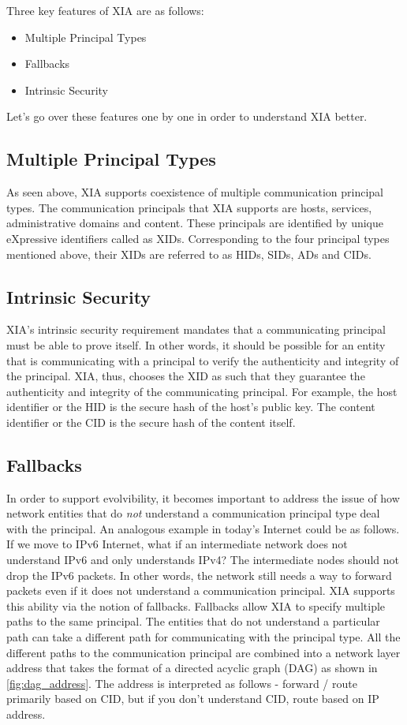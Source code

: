 Three key features of XIA are as follows:
\begin{itemize}
\item{Multiple Principal Types}
\item{Fallbacks}
\item{Intrinsic Security}
\end{itemize}
Let's go over these features one by one in order to understand XIA
better.
\subsection{Multiple Principal Types}
As seen above, XIA supports coexistence of multiple communication
principal types. The communication principals that XIA supports are
hosts, services, administrative domains and content. These principals
are identified by unique eXpressive identifiers called as
XIDs. Corresponding to the four principal types mentioned above, their
XIDs are referred to as HIDs, SIDs, ADs and CIDs.

\subsection{Intrinsic Security}
XIA's intrinsic security requirement mandates that a communicating
principal must be able to prove itself. In other words, it should be
possible for an entity that is communicating with a principal to
verify the authenticity and integrity of the principal. XIA, thus,
chooses the XID as such that they guarantee the authenticity and
integrity of the communicating principal. For example, the host
identifier or the HID is the secure hash of the host's public key. The
content identifier or the CID is the secure hash of the content
itself.

\subsection{Fallbacks}
In order to support evolvibility, it becomes important to address the
issue of how network entities that do \emph{not} understand a
communication principal type deal with the principal. An analogous
example in today's Internet could be as follows. If we move to IPv6
Internet, what if an intermediate network does not understand IPv6 and
only understands IPv4? The intermediate nodes should not drop the IPv6
packets. In other words, the network still needs a way to forward
packets even if it does not understand a communication principal. XIA
supports this ability via the notion of fallbacks. Fallbacks allow XIA
to specify multiple paths to the same principal. The entities that do
not understand a particular path can take a different path for
communicating with the principal type. All the different paths to the
communication principal are combined into a network layer address that
takes the format of a directed acyclic graph (DAG) as shown in
\ref{fig:dag_address}. The address is interpreted as follows - forward
/ route primarily based on CID, but if you don't understand CID, route
based on IP address.

